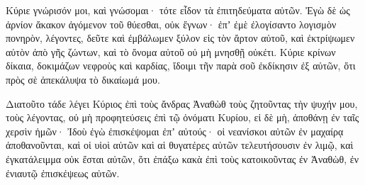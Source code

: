 {\par }{\PP {}Κύριε γνώρισόν μοι, καὶ γνώσομαι· τότε εἶδον τὰ ἐπιτηδεύματα αὐτῶν.
Ἐγὼ δὲ ὡς ἀρνίον ἄκακον ἀγόμενον τοῦ θύεσθαι, οὐκ ἔγνων· ἐπʼ ἐμὲ ἐλογίσαντο λογισμὸν πονηρὸν, λέγοντες, δεῦτε καὶ ἐμβάλωμεν ξύλον εἰς τὸν ἄρτον αὐτοῦ, καὶ ἐκτρίψωμεν αὐτὸν ἀπὸ γῆς ζώντων, καὶ τὸ ὄνομα αὐτοῦ οὐ μὴ μνησθῇ οὐκέτι.
Κύριε κρίνων δίκαια, δοκιμάζων νεφροὺς καὶ καρδίας, ἴδοιμι τῆν παρὰ σοῦ ἐκδίκησιν ἐξ αὐτῶν, ὅτι πρὸς σὲ ἀπεκάλυψα τὸ δικαίωμά μου.
\par }{\PP {}Διατοῦτο τάδε λέγει Κύριος ἐπὶ τοὺς ἄνδρας Ἀναθὼθ τοὺς ζητοῦντας τὴν ψυχήν μου, τοὺς λέγοντας, οὐ μὴ προφητεύσεις ἐπὶ τῷ ὀνόματι Κυρίου, εἰ δὲ μὴ, ἀποθάνῃ ἐν ταῖς χερσὶν ἡμῶν·
Ἰδοὺ ἐγὼ ἐπισκέψομαι ἐπʼ αὐτούς· οἱ νεανίσκοι αὐτῶν ἐν μαχαίρᾳ ἀποθανοῦνται, καὶ οἱ υἱοὶ αὐτῶν καὶ αἱ θυγατέρες αὐτῶν τελευτήσουσιν ἐν λιμῷ,
καὶ ἐγκατάλειμμα οὐκ ἔσται αὐτῶν, ὅτι ἐπάξω κακὰ ἐπὶ τοὺς κατοικοῦντας ἐν Ἀναθὼθ, ἐν ἐνιαυτῷ ἐπισκέψεως αὐτῶν.

}
